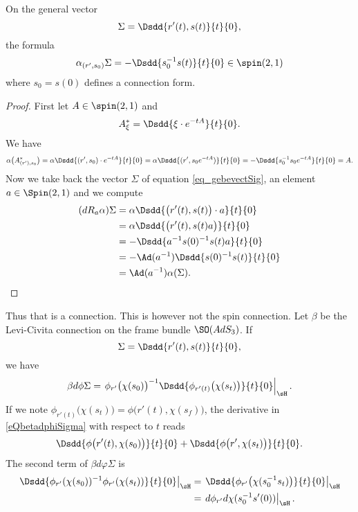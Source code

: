 \begin{lemma}
On the general vector 
\begin{equation}   \label{eq_gebevectSig}
  \Sigma=\Dsdd{ r'(t),s(t) }{t}{0},
\end{equation}
the formula
\begin{equation}
\alpha_{(r',s_{0})}\Sigma=-\Dsdd{ s_{0}^{-1}s(t) }{t}{0}\in\spin(2,1)
\end{equation}
where $s_{0}=s(0)$ defines a connection form.

\end{lemma}

\begin{proof}
First let $A\in\spin(2,1)$ and
\[ 
  A^*_{\xi}=\Dsdd{ \xi\cdot e^{-tA} }{t}{0}.
\]
We have
\[ 
   \alpha\big( A^*_{(r'),s_{0}} \big)=\alpha \Dsdd{ (r',s_{0})\cdot e^{-tA}  }{t}{0}
        =\alpha\Dsdd{ (r',s_{0} e^{-tA}) }{t}{0}
        =-\Dsdd{ s_{0}^{-1}s_{0} e^{-tA}} {t}{0}
        =A.
\]
Now we take back the vector $\Sigma$ of equation \eqref{eq_gebevectSig}, an element $a\in\Spin(2,1)$ and we compute
\[ 
\begin{split}
  (dR_{a}\alpha)\Sigma&=\alpha\Dsdd{ \big( r'(t),s(t) \big)\cdot a }{t}{0}\\
        &=\alpha\Dsdd{ \big( r'(t),s(t)a \big) }{t}{0}\\
        &=-\Dsdd{ a^{-1}s(0)^{-1}s(t)a }{t}{0}\\
        &=-\Ad(a^{-1})\Dsdd{ s(0)^{-1}s(t) }{t}{0}\\
        &=\Ad(a^{-1})\alpha(\Sigma).
\end{split}  
\]

\end{proof}
Thus that is a connection. This is however not the spin connection. Let $\beta$ be the Levi-Civita connection on the frame bundle $\SO(AdS_3)$. If 
\[ 
  \Sigma=\Dsdd{ r'(t),s(t) }{t}{0},
\]
we have
\begin{equation} \label{eQbetadphiSigma}
  \beta d\phi\Sigma=\left. \phi_{r'}\big( \chi(s_{0}) \big)^{-1}\Dsdd{ \phi_{r'(t)}\big( \chi(s_{t}) \big) }{t}{0}\right|_{\sH}.
\end{equation}
If we note $\phi_{r'(t)}\big( \chi(s_{t}) \big)=\phi\big( r'(t),\chi(s_{f}) \big)$, the derivative in \eqref{eQbetadphiSigma} with respect to $t$ reads
\begin{equation}
\Dsdd{ \phi\big( r'(t),\chi(s_{0}) \big) }{t}{0}+\Dsdd{ \phi\big( r',\chi(s_{t}) \big) }{t}{0}.
\end{equation}
The second term of $\beta d\varphi\Sigma$ is
\begin{align*}
\left. \Dsdd{ \phi_{r'}(\chi(s_{0}))^{-1}\phi_{r'}(\chi(s_{t})) }{t}{0}\right|_{\sH}
        &=\left. \Dsdd{ \phi_{r'}\big( \chi(s_{0}^{-1}s_{t}) \big) }{t}{0}\right|_{\sH}\\
        &=\left. d\phi_{r'}d\chi(s_{0}^{-1}s'(0))\right|_{\sH}.
\end{align*}
